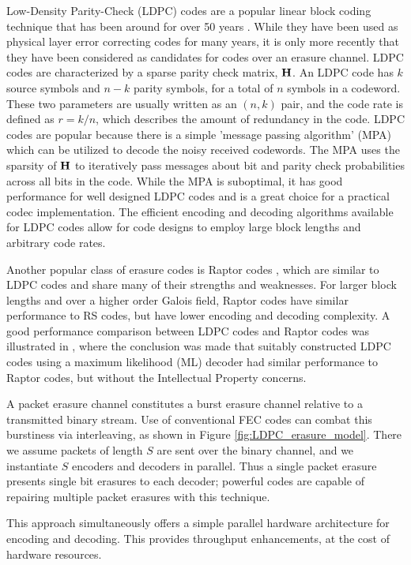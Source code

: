 \documentclass[conference]{IEEEtran}
\begin{document}
Low-Density Parity-Check (LDPC) codes are a popular linear block coding technique that has been around for over 50 years \cite{Gallager-62}.  While they have been used as physical layer error correcting codes for many years, it is only more recently that they have been considered as candidates for codes over an erasure channel.  LDPC codes are characterized by a sparse parity check matrix, $\bf{H}$.  An LDPC code has $k$ source symbols and $n-k$ parity symbols, for a total of $n$ symbols in a codeword.  These two parameters are usually written as an $(n, k)$ pair, and the code rate is defined as $r=k/n$, which describes the amount of redundancy in the code.  LDPC codes are popular because there is a simple 'message passing algorithm' (MPA) which can be utilized to decode the noisy received codewords.  The MPA uses the sparsity of $\bf{H}$ to iteratively pass messages about bit and parity check probabilities across all bits in the code.  While the MPA is suboptimal, it has good performance for well designed LDPC codes and is a great choice for a practical codec implementation.  The efficient encoding and decoding algorithms available for LDPC codes allow for code designs to employ large block lengths and arbitrary code rates.

Another popular class of erasure codes is Raptor codes \cite{Shokrollahi-06}, which are similar to LDPC codes and share many of their strengths and weaknesses.  For larger block lengths and over a higher order Galois field, Raptor codes have similar performance to RS codes, but have lower encoding and decoding complexity.  A good performance comparison between LDPC codes and Raptor codes was illustrated in \cite{Roca-2013}, where the conclusion was made that suitably constructed LDPC codes using a maximum likelihood (ML) decoder had similar performance to Raptor codes, but without the Intellectual Property concerns.

A packet erasure channel constitutes a burst erasure channel relative to a transmitted binary stream.  Use of conventional FEC codes can combat this burstiness via interleaving, as shown
in Figure \ref{fig:LDPC_erasure_model}.  There we assume packets of length $S$ are sent over the binary channel, and we
instantiate $S$ encoders and decoders in parallel.  Thus a single packet erasure presents single
bit erasures to each decoder; powerful codes are capable of repairing multiple packet erasures
with this technique.

This approach simultaneously offers a simple parallel hardware architecture for encoding and decoding.  This provides throughput enhancements, at the cost of hardware resources.
\end{document}

